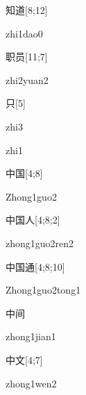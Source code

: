 \begin{verbete}{知道}[8;12]
\begin{pronuncia}{zhi1dao0}
\end{pronuncia}
\end{verbete}

\begin{verbete}{职员}[11;7]
\begin{pronuncia}{zhi2yuan2}
\end{pronuncia}
\end{verbete}

\begin{verbete}[zhi3]{只}[5]
\begin{pronuncia}{zhi3}
\end{pronuncia}
\begin{pronuncia}{zhi1}
\end{pronuncia}
\end{verbete}

\begin{verbete}{中国}[4;8]
\begin{pronuncia}{Zhong1guo2}
\end{pronuncia}
\end{verbete}

\begin{verbete}{中国人}[4;8;2]
\begin{pronuncia}{zhong1guo2ren2}
\end{pronuncia}
\end{verbete}

\begin{verbete}{中国通}[4;8;10]
\begin{pronuncia}[\\]{Zhong1guo2tong1}
\end{pronuncia}
\end{verbete}

\begin{verbete}{中间}
\begin{pronuncia}{zhong1jian1}
\end{pronuncia}
\end{verbete}

\begin{verbete}{中文}[4;7]
\begin{pronuncia}{zhong1wen2}
\end{pronuncia}
\end{verbete}

